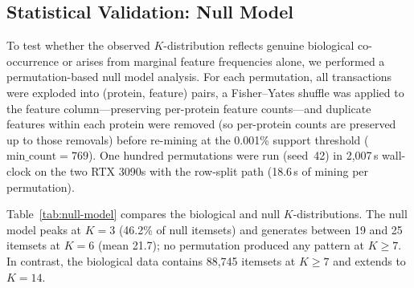 \documentclass[10pt,a4paper,twocolumn]{article}
\begin{document}
\subsection{Statistical Validation: Null Model}
\label{sec:null-model}

To test whether the observed $K$-distribution reflects genuine biological co-occurrence or arises from marginal feature frequencies alone, we performed a permutation-based null model analysis. For each permutation, all transactions were exploded into (protein, feature) pairs, a Fisher--Yates shuffle was applied to the feature column---preserving per-protein feature counts---and duplicate features within each protein were removed (so per-protein counts are preserved up to those removals) before re-mining at the 0.001\% support threshold ($\text{min\_count}{=}769$). One hundred permutations were run (seed~42) in 2,007\,s wall-clock on the two RTX 3090s with the row-split path (18.6\,s of mining per permutation).

Table~\ref{tab:null-model} compares the biological and null $K$-distributions. The null model peaks at $K{=}3$ (46.2\% of null itemsets) and generates between 19 and 25 itemsets at $K{=}6$ (mean 21.7); no permutation produced any pattern at $K{\geq}7$. In contrast, the biological data contains 88,745 itemsets at $K{\geq}7$ and extends to $K{=}14$.

\begin{table}[t]
\caption{Biological vs.\ null model $K$-distributions at 0.001\% support (100 permutations, seed 42). $Z=(\text{Bio}-\mu)/\sigma$ with $\mu$ and $\sigma$ estimated from the 100 permutations; because $\sigma$ is tiny relative to the biological excess, the magnitudes indicate strong enrichment rather than calibrated tail probabilities. $p$ is the one-sided empirical permutation $p$-value for enrichment with the $+1$ correction~\cite{phipson2010}, whose resolution with 100 permutations is $1/101{\approx}0.0099$. $K{\geq}7$ patterns are absent from all 100 null runs; the exact one-sided binomial 95\% upper bound on the per-permutation probability of any such pattern is $1-0.05^{1/100}=0.0295$.}
\label{tab:null-model}
\centering
{}
\end{table}
\end{document}
